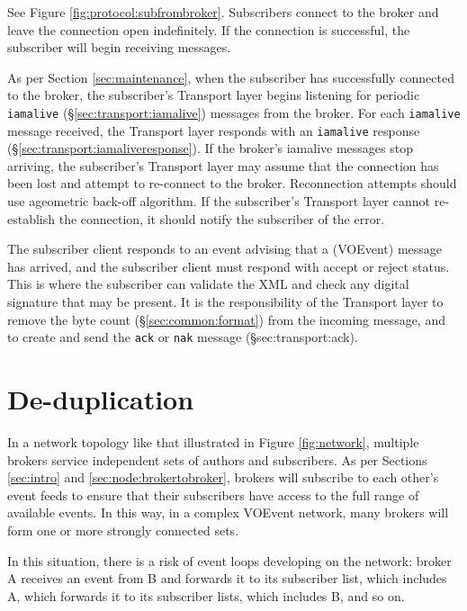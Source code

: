 \documentclass[a4paper,11pt]{ivoa}
\begin{document}
See Figure \ref{fig:protocol:subfrombroker}. Subscribers connect to the broker
and leave the connection open indefinitely. If the connection is successful,
the subscriber will begin receiving messages.

As per Section \ref{sec:maintenance}, when the subscriber has successfully connected to the
broker, the subscriber's Transport layer begins listening for periodic
\texttt{iamalive} (\S\ref{sec:transport:iamalive}) messages from the broker.
For each \texttt{iamalive} message
received, the Transport layer responds with an \texttt{iamalive} response
(\S\ref{sec:transport:iamaliveresponse}).
If the broker's iamalive messages stop arriving, the subscriber's Transport
layer may assume that the connection has been lost and attempt to re-connect
to the broker. Reconnection attempts should use ageometric back-off algorithm.
If the subscriber's Transport layer cannot re-establish the connection, it
should notify the subscriber of the error.

The subscriber client responds to an event advising that a (VOEvent) message
has arrived, and the subscriber client must respond with accept or reject
status. This is where the subscriber can validate the XML and check any
digital signature that may be present. It is the responsibility of the
Transport layer to remove the byte count (\S\ref{sec:common:format}) from the
incoming message, and to create and send the \texttt{ack} or \texttt{nak}
message (\S{sec:transport:ack}).

\section{De-duplication}
\label{sec:dedup}

In a network topology like that illustrated in Figure \ref{fig:network},
multiple brokers service independent sets of authors and subscribers. As per
Sections \ref{sec:intro} and \ref{sec:node:brokertobroker}, brokers will
subscribe to each other's event feeds to ensure that their subscribers have
access to the full range of available events. In this way, in a complex
VOEvent network, many brokers will form one or more strongly connected sets.

In this situation, there is a risk of event loops developing on the network:
broker A receives an event from B and forwards it to its subscriber list,
which includes A, which forwards it to its subscriber lists, which includes B,
and so on.
\end{document}
